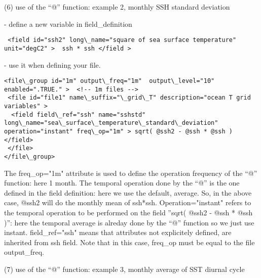 \documentclass[NEMO_book]{subfiles}
\begin{document}
(6) use of the ``@'' function: example 2, monthly SSH standard deviation

 - define a new variable in field\_definition
\vspace{-20pt}
\begin{alltt}  {{\scriptsize    
\begin{verbatim}
 <field id="ssh2" long\_name="square of sea surface temperature" unit="degC2" >  ssh * ssh </field >
\end{verbatim}
}}\end{alltt} 
 - use it when defining your file.  
\vspace{-20pt}
\begin{alltt}  {{\scriptsize    
\begin{verbatim}
<file\_group id="1m" output\_freq="1m"  output\_level="10" enabled=".TRUE." >  <!-- 1m files -->  
 <file id="file1" name\_suffix="\_grid\_T" description="ocean T grid variables" >
  <field field\_ref="ssh" name="sshstd" long\_name="sea\_surface\_temperature\_standard\_deviation" operation="instant" freq\_op="1m" > sqrt( @ssh2 - @ssh * @ssh ) </field>
 </file>
</file\_group> 
\end{verbatim}
}}\end{alltt}
The freq\_op="1m" attribute is used to define the operation frequency of the ``@'' function: here 1 month. The temporal operation done by the ``@'' is the one defined in the field definition: here we use the default, average. So, in the above case, @ssh2 will do the monthly mean of ssh*ssh. Operation="instant" refers to the temporal operation to be performed on the field ''sqrt( @ssh2 - @ssh * @ssh )'': here the temporal average is alreday done by the ``@'' function so we just use instant. field\_ref="ssh" means that attributes not explicitely defined, are inherited from ssh field. Note that in this case, freq\_op must be equal to the file output\_freq.

(7) use of the ``@'' function: example 3, monthly average of SST diurnal cycle
\end{document}
